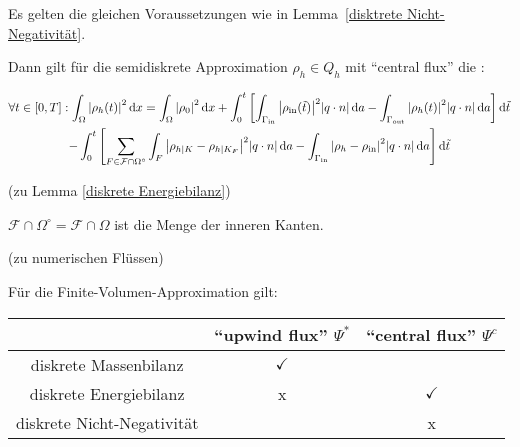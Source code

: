 \begin{Lemma} \label{diskrete Energiebilanz}	Es gelten die gleichen Voraussetzungen wie in Lemma~\ref{disktrete Nicht-Negativität}.
	
	Dann gilt für die semidiskrete Approximation $ \rho_h \in Q_h $ mit \enquote{central flux} die :
	
	\begin{gather*}
		\forall t \in [0,T]: \int_\Omega \abs{\rho_h(t)}^2 \diff x = \int_\Omega \abs{\rho_0}^2 \diff x + \int_{0}^{t} \left[ \int_{\Gammain} \abs{\rhoin(\tilde{t})}^2 \abs{q \cdot n} \diff a - \int_{\Gammaout} \abs{\rho_h(t)}^2 \abs{q \cdot n} \diff a \right] \diff \tilde{t} \\
		 -\int_0^t \left[ \sum_{F\in \mathcal{F} \cap \Omega^\circ} \int_F \abs{\rho_{h|K} - \rho_{h|K_F}}^2 \abs{q \cdot n} \diff a - \int_{\Gammain} \abs{\rho_h - \rhoin}^2 \abs{q\cdot n} \diff a \right] \diff \tilde{t}
	\end{gather*}
	
\end{Lemma}
 
 
 \begin{remark}(zu Lemma \ref{diskrete Energiebilanz})
 	
 	$ \mathcal{F} \cap \Omega^\circ = \mathcal{F} \cap \Omega $ ist die Menge der inneren Kanten.
 \end{remark}

\begin{remark}(zu numerischen Flüssen)
	

	Für die Finite-Volumen-Approximation gilt:

	\begin{tabular}{c || c | c}
		&\enquote{upwind flux} $ \Psi^* $ & \enquote{central flux} $ \Psi^c $  \\ \hline 
		diskrete Massenbilanz & $\checkmark$ &   \\ \hline
		diskrete Energiebilanz & x  & $ \checkmark $ \\ \hline
		diskrete Nicht-Negativität &  & x  \\
	\end{tabular}
\end{remark}

